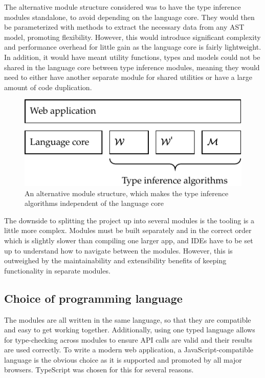 \documentclass[a4paper,fleqn,oneside,12pt]{report}
\begin{document}
The alternative module structure considered was to have the type inference modules standalone, to avoid depending on the language core. They would then be parameterized with methods to extract the necessary data from any AST model, promoting flexibility. However, this would introduce significant complexity and performance overhead for little gain as the language core is fairly lightweight. In addition, it would have meant utility functions, types and models could not be shared in the language core between type inference modules, meaning they would need to either have another separate module for shared utilities or have a large amount of code duplication.

{\centering \begin{figure}[h!]
  \centering
  \includegraphics[width=0.65\linewidth]{images/module_structure_alt.pdf}
  \caption{An alternative module structure, which makes the type inference algorithms independent of the language core}
\end{figure} \par}

The downside to splitting the project up into several modules is the tooling is a little more complex. Modules must be built separately and in the correct order which is slightly slower than compiling one larger app, and IDEs have to be set up to understand how to navigate between the modules. However, this is outweighed by the maintainability and extensibility benefits of keeping functionality in separate modules.

\subsection{Choice of programming language}\label{id:h.dj2rwwqr30vu}

The modules are all written in the same language, so that they are compatible and easy to get working together. Additionally, using one typed language allows for type-checking across modules to ensure API calls are valid and their results are used correctly. To write a modern web application, a JavaScript-compatible language is the obvious choice as it is supported and promoted by all major browsers. TypeScript was chosen for this for several reasons.
\end{document}
